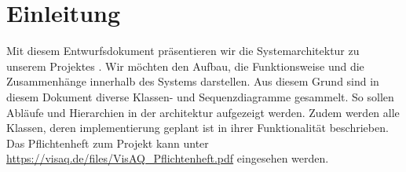 \section{Einleitung}
Mit diesem Entwurfsdokument präsentieren wir die Systemarchitektur zu unserem Projektes \softwarename.
Wir möchten den Aufbau, die Funktionsweise und die Zusammenhänge innerhalb des Systems darstellen.
Aus diesem Grund sind in diesem Dokument diverse Klassen- und Sequenzdiagramme gesammelt.
So sollen Abläufe und Hierarchien in der architektur aufgezeigt werden.
Zudem werden alle Klassen, deren implementierung geplant ist in ihrer Funktionalität beschrieben.
\\
Das Pflichtenheft zum Projekt \softwarename kann unter \url{https://visaq.de/files/VisAQ_Pflichtenheft.pdf} eingesehen werden.